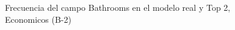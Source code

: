 \begin{figure}[H]
    \centering
    
    \caption{Frecuencia del campo Bathrooms en el modelo real y Top 2, Economicos (B-2)}
    \label{frecuency-Bathrooms-top2}
\end{figure}